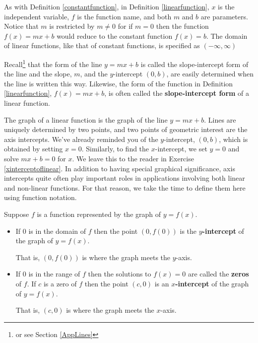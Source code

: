 \documentclass{ximera}
\begin{document}
As with Definition \ref{constantfunction},  in Definition \ref{linearfunction}, $x$ is the independent variable, $f$ is the function name, and both $m$ and $b$ are parameters.  Notice that $m$ is restricted by $m \neq 0$ for if $m = 0$ then the function $f(x) = mx + b$ would reduce to the constant function $f(x) = b$.  The domain of linear functions, like that of constant functions,  is specified as $(-\infty, \infty)$



Recall\footnote{or see Section \ref{AppLines}} that the form of the line $y = mx + b$ is called the slope-intercept form of the line and the slope,  $m$, and the $y$-intercept $(0, b)$, are easily determined when the line is written this way. Likewise, the form of the function in Definition \ref{linearfunction}, $f(x) = mx + b$, is often called the  \textbf{slope-intercept form} of a linear function.



The graph of a linear function is the graph of the line  $y = mx + b$.   Lines are uniquely determined by two points, and two points of geometric interest are the axis intercepts.  We've already reminded you of the $y$-intercept, $(0,b)$, which is obtained by setting $x = 0$. Similarly, to find the $x$-intercept, we set $y = 0$ and solve $mx + b = 0$ for $x$.  We leave this to the reader in Exercise \ref{xinterceptoflinear}.  In addition to having special graphical significance, axis intercepts quite often play important roles in applications involving both linear and non-linear functions.   For that reason, we take the time to define them here using function notation.




\begin{definition}

\label{interceptdefns}

Suppose $f$ is a function represented by the graph of $y = f(x)$.

\begin{itemize}

\item  If $0$ is in the domain of $f$ then the point $(0, f(0))$ is the   \textbf{$y$-intercept} of the graph of $y = f(x)$.

That is, $(0,f(0))$ is where the graph meets the $y$-axis.

\item  If $0$ is in the range of $f$ then the solutions to $f(x) = 0$ are called the  \textbf{zeros} of $f$.  If $c$ is a zero of $f$ then the point $(c,0)$ is an   \textbf{$x$-intercept} of the graph of $y = f(x)$.

That is, $(c,0)$ is where the graph meets the $x$-axis.

\end{itemize}

\end{definition}
\end{document}
